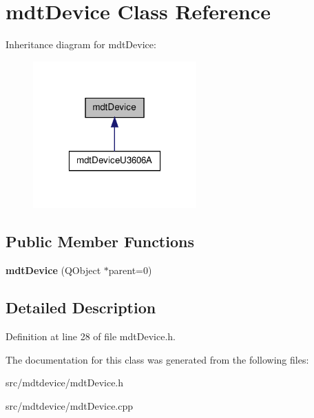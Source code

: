 \hypertarget{classmdt_device}{
\section{mdtDevice Class Reference}
\label{classmdt_device}
}


Inheritance diagram for mdtDevice:\nopagebreak
\begin{figure}[H]
\begin{center}
\leavevmode
\includegraphics[width=178pt]{classmdt_device__inherit__graph}
\end{center}
\end{figure}
\subsection*{Public Member Functions}
\begin{DoxyCompactItemize}
\item 
\hypertarget{classmdt_device_a6d501791e7243358cc61b144254b80db}{
{\bfseries mdtDevice} (QObject $\ast$parent=0)}
\label{classmdt_device_a6d501791e7243358cc61b144254b80db}

\end{DoxyCompactItemize}


\subsection{Detailed Description}


Definition at line 28 of file mdtDevice.h.



The documentation for this class was generated from the following files:\begin{DoxyCompactItemize}
\item 
src/mdtdevice/mdtDevice.h\item 
src/mdtdevice/mdtDevice.cpp\end{DoxyCompactItemize}
